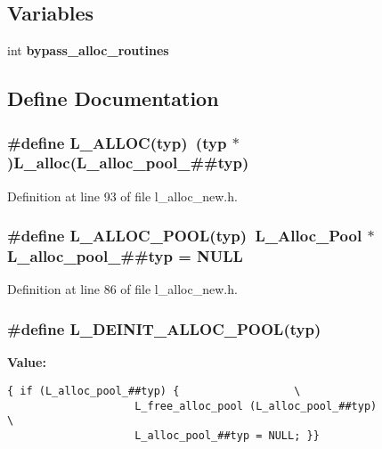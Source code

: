 \subsection*{Variables}
\begin{CompactItemize}
\item 
int \bf{bypass\_\-alloc\_\-routines}
\end{CompactItemize}


\subsection{Define Documentation}
\subsubsection{\setlength{\rightskip}{0pt plus 5cm}\#define L\_\-ALLOC(typ)~(typ $\ast$)L\_\-alloc(L\_\-alloc\_\-pool\_\-\#\#typ)}\label{l__alloc__new_8h_9bf3de54ba957100c399000d14ace572}




Definition at line 93 of file l\_\-alloc\_\-new.h.
\subsubsection{\setlength{\rightskip}{0pt plus 5cm}\#define L\_\-ALLOC\_\-POOL(typ)~\bf{L\_\-Alloc\_\-Pool} $\ast$L\_\-alloc\_\-pool\_\-\#\#typ = NULL}\label{l__alloc__new_8h_dbfa07b4c5fbfb0ccfe3c71b58733977}




Definition at line 86 of file l\_\-alloc\_\-new.h.
\subsubsection{\setlength{\rightskip}{0pt plus 5cm}\#define L\_\-DEINIT\_\-ALLOC\_\-POOL(typ)}\label{l__alloc__new_8h_aec55c8ebb3a44715795946a2a415ade}


\textbf{Value:}

\begin{Code}\begin{verbatim}{ if (L_alloc_pool_##typ) {                  \
                    L_free_alloc_pool (L_alloc_pool_##typ)                    \
                    L_alloc_pool_##typ = NULL; }}
\end{verbatim}\end{Code}


